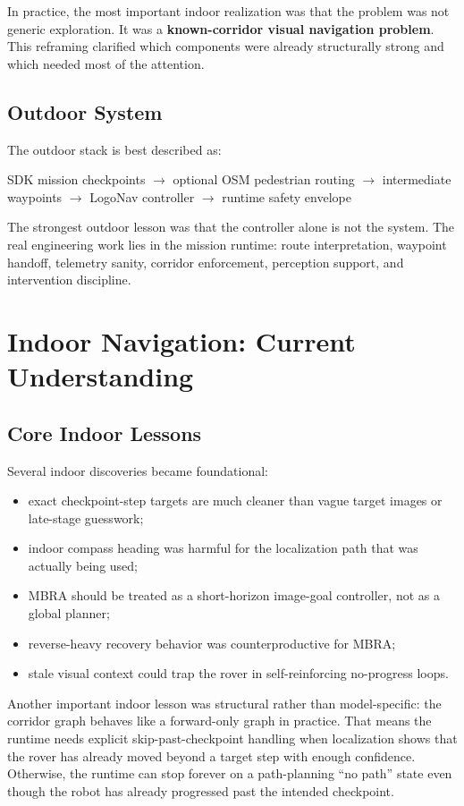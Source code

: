 \documentclass[11pt]{article}
\begin{document}
In practice, the most important indoor realization was that the problem was not generic exploration. It was a \textbf{known-corridor visual navigation problem}. This reframing clarified which components were already structurally strong and which needed most of the attention.

\subsection{Outdoor System}
The outdoor stack is best described as:
\begin{center}
SDK mission checkpoints $\rightarrow$ optional OSM pedestrian routing $\rightarrow$ intermediate waypoints $\rightarrow$ LogoNav controller $\rightarrow$ runtime safety envelope
\end{center}

The strongest outdoor lesson was that the controller alone is not the system. The real engineering work lies in the mission runtime: route interpretation, waypoint handoff, telemetry sanity, corridor enforcement, perception support, and intervention discipline.

\section{Indoor Navigation: Current Understanding}
\subsection{Core Indoor Lessons}
Several indoor discoveries became foundational:
\begin{itemize}[leftmargin=*]
  \item exact checkpoint-step targets are much cleaner than vague target images or late-stage guesswork;
  \item indoor compass heading was harmful for the localization path that was actually being used;
  \item MBRA should be treated as a short-horizon image-goal controller, not as a global planner;
  \item reverse-heavy recovery behavior was counterproductive for MBRA;
  \item stale visual context could trap the rover in self-reinforcing no-progress loops.
\end{itemize}

Another important indoor lesson was structural rather than model-specific: the corridor graph behaves like a forward-only graph in practice. That means the runtime needs explicit skip-past-checkpoint handling when localization shows that the rover has already moved beyond a target step with enough confidence. Otherwise, the runtime can stop forever on a path-planning ``no path'' state even though the robot has already progressed past the intended checkpoint.
\end{document}
